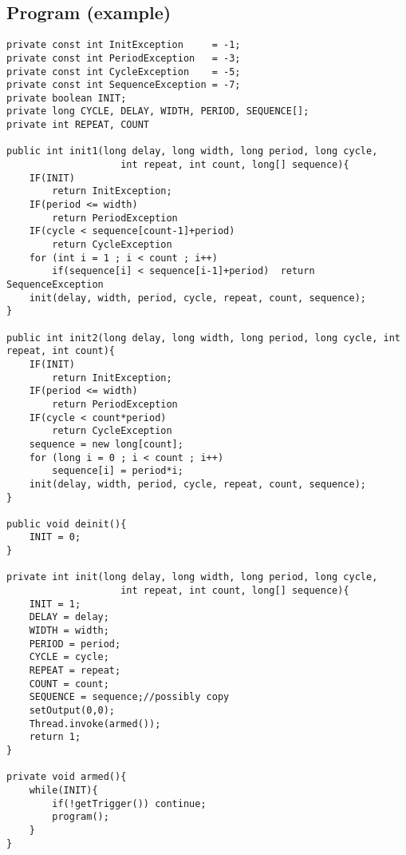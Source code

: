 \documentclass{article}
\begin{document}
\clearpage\thispagestyle{empty}
\subsection*{Program (example)}
\begin{lstlisting}
private const int InitException     = -1;
private const int PeriodException   = -3;
private const int CycleException    = -5;
private const int SequenceException = -7;
private boolean INIT;
private long CYCLE, DELAY, WIDTH, PERIOD, SEQUENCE[];
private int REPEAT, COUNT

public int init1(long delay, long width, long period, long cycle,
					int repeat, int count, long[] sequence){
	IF(INIT)
		return InitException;
	IF(period <= width)
		return PeriodException
	IF(cycle < sequence[count-1]+period)
		return CycleException
	for (int i = 1 ; i < count ; i++)
		if(sequence[i] < sequence[i-1]+period)  return SequenceException
	init(delay, width, period, cycle, repeat, count, sequence);
}

public int init2(long delay, long width, long period, long cycle, int repeat, int count){
	IF(INIT)
		return InitException;
	IF(period <= width)
		return PeriodException
	IF(cycle < count*period)
		return CycleException
	sequence = new long[count];
	for (long i = 0 ; i < count ; i++)
		sequence[i] = period*i;
	init(delay, width, period, cycle, repeat, count, sequence);
}

public void deinit(){
	INIT = 0;
}

private int init(long delay, long width, long period, long cycle,
					int repeat, int count, long[] sequence){
	INIT = 1;
	DELAY = delay;
	WIDTH = width;
	PERIOD = period;
	CYCLE = cycle;
	REPEAT = repeat;
	COUNT = count;
	SEQUENCE = sequence;//possibly copy
	setOutput(0,0);
	Thread.invoke(armed());
	return 1;
}
					
private void armed(){
	while(INIT){
		if(!getTrigger()) continue;
		program();
	}
}
\end{lstlisting}
\clearpage\thispagestyle{empty}
\end{document}
